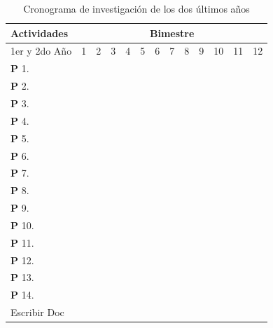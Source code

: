 \begin{table}[!htb]
  \centering
  \newcommand{\Bk}{\multicolumn{1}{|G|}{ }}
  \begin{tabular}{|p{3.0cm}||c|c|c|c|c|c|c|c|c|c|c|c|}\hline
    Actividades&\multicolumn{12}{|c|}{Bimestre}\\\hline\hline
    1er y  2do A\~no&1&2 &3  &4  &5  &6  &7  &8  &9  &10 &11 &12 \\\hline
    \textbf{P} 1. &\Bk&   &   &   &   &   &   &   &   &   &   &   \\\hline
    \textbf{P} 2. &\Bk&\Bk&\Bk&\Bk&\Bk&\Bk&\Bk&   &   &\Bk&\Bk&   \\\hline
    \textbf{P} 3. &\Bk&\Bk&\Bk&\Bk&\Bk&\Bk&\Bk&   &   &\Bk&\Bk&   \\\hline
    \textbf{P} 4. &\Bk&   &   &   &   &   &   &   &   &   &   &   \\\hline
    \textbf{P} 5. &   &   &   &   &   &   &   &   &   &   &   &   \\\hline
    \textbf{P} 6. &   &   &   &   &\Bk&   &   &   &   &   &   &   \\\hline
    \textbf{P} 7. &\Bk&   &   &\Bk&\Bk&   &   &   &   &   &   &   \\\hline
    \textbf{P} 8. &   &   &   &   &   &   &   &   &   &   &   &   \\\hline
    \textbf{P} 9. &\Bk&   &   &\Bk&\Bk&   &   &\Bk&\Bk&   &   &   \\\hline
    \textbf{P} 10.&   &   &   &   &   &   &\Bk&   &   &   &\Bk&   \\\hline
    \textbf{P} 11.&\Bk&   &   &   &   &   &\Bk&   &   &   &\Bk&   \\\hline
    \textbf{P} 12.&\Bk&\Bk&\Bk&\Bk&\Bk&\Bk&\Bk&\Bk&\Bk&\Bk&\Bk&\Bk\\\hline
    \textbf{P} 13.&   &   &   &\Bk&\Bk&   &   &\Bk&   &   &   &   \\\hline
    \textbf{P} 14.&   &   &   &   &\Bk&\Bk&\Bk&   &\Bk&\Bk&\Bk&\Bk\\\hline
    Escribir Doc &   &\Bk&   &\Bk&   &\Bk&   &\Bk&   &\Bk&\Bk&\Bk\\\hline    
  \end{tabular}
  \caption{Cronograma de investigaci\'on de los dos \'ultimos a\~nos}
  \label{tab:crono2}
\end{table}

